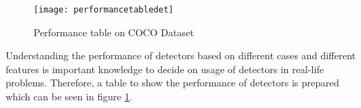 \documentclass{article}
\begin{document}
\setlength{\parindent}{6ex}

\begin{figure}
    \centering
    \texttt{[image: performancetabledet]}
    \caption{Performance table on COCO Dataset}
    \label{fig:performancetable1}
\end{figure}

\indent

Understanding the performance of detectors based on different cases and different 
features is important knowledge to decide on usage of detectors in real-life problems. 
Therefore, a table to show the performance of detectors is prepared which can be 
seen in figure \ref{fig:performancetable1}.
\end{document}
